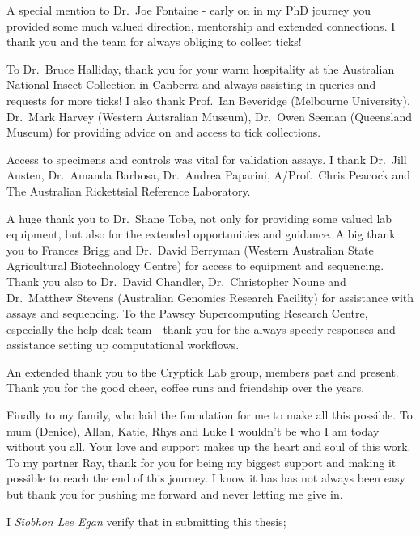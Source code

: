 \documentclass[a4paper, nobind]{templates/ociamthesis}
\begin{document}
\begin{romanpages}
\begin{acknowledgements}
  A special mention to Dr.~Joe Fontaine - early on in my PhD journey you provided some much valued direction, mentorship and extended connections. I thank you and the team for always obliging to collect ticks!

  To Dr.~Bruce Halliday, thank you for your warm hospitality at the Australian National Insect Collection in Canberra and always assisting in queries and requests for more ticks! I also thank Prof.~Ian Beveridge (Melbourne University), Dr.~Mark Harvey (Western Autsralian Museum), Dr.~Owen Seeman (Queensland Museum) for providing advice on and access to tick collections.

  Access to specimens and controls was vital for validation assays. I thank Dr.~Jill Austen, Dr.~Amanda Barbosa, Dr.~Andrea Paparini, A/Prof.~Chris Peacock and The Australian Rickettsial Reference Laboratory.

  A huge thank you to Dr.~Shane Tobe, not only for providing some valued lab equipment, but also for the extended opportunities and guidance. A big thank you to Frances Brigg and Dr.~David Berryman (Western Australian State Agricultural Biotechnology Centre) for access to equipment and sequencing. Thank you also to Dr.~David Chandler, Dr.~Christopher Noune and Dr.~Matthew Stevens (Australian Genomics Research Facility) for assistance with assays and sequencing. To the Pawsey Supercomputing Research Centre, especially the help desk team - thank you for the always speedy responses and assistance setting up computational workflows.

  An extended thank you to the Cryptick Lab group, members past and present. Thank you for the good cheer, coffee runs and friendship over the years.

  Finally to my family, who laid the foundation for me to make all this possible.
  To mum (Denice), Allan, Katie, Rhys and Luke I wouldn't be who I am today without you all. Your love and support makes up the heart and soul of this work.
  To my partner Ray, thank for you for being my biggest support and making it possible to reach the end of this journey.
  I know it has has not always been easy but thank you for pushing me forward and never letting me give in.
\end{acknowledgements}




\begin{declaration}
 	I \emph{Siobhon Lee Egan} verify that in submitting this thesis;


\end{declaration}
\end{romanpages}
\end{document}
